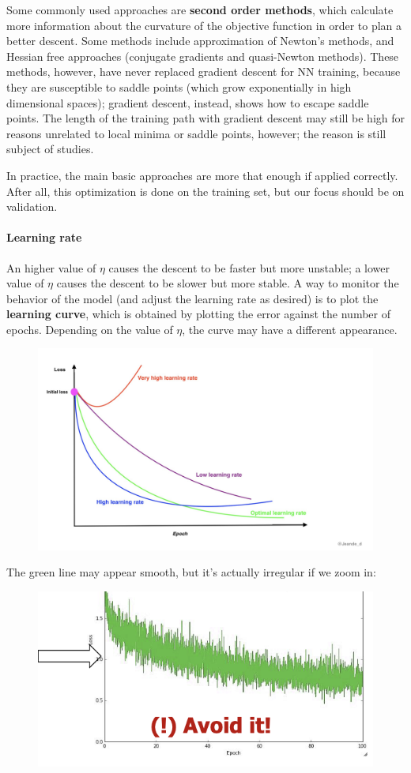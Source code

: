 Some commonly used approaches are \textbf{second order methods}, which calculate more information about the curvature of the objective function in order to plan a better descent. Some methods include approximation of Newton's methods, and Hessian free approaches (conjugate gradients and quasi-Newton methods). These methods, however, have never replaced gradient descent for NN training, because they are susceptible to saddle points (which grow exponentially in high dimensional spaces); gradient descent, instead, shows how to escape saddle points. The length of the training path with gradient descent may still be high for reasons unrelated to local minima or saddle points, however; the reason is still subject of studies. 

In practice, the main basic approaches are more that enough if applied correctly. After all, this optimization is done on the training set, but our focus should be on validation.

\paragraph{Learning rate}

An higher value of $\eta$ causes the descent to be faster but more unstable; a lower value of $\eta$ causes the descent to be slower but more stable. A way to monitor the behavior of the model (and adjust the learning rate as desired) is to plot the \textbf{learning curve}, which is obtained by plotting the error against the number of epochs. Depending on the value of $\eta$, the curve may have a different appearance.

\begin{figure}[h]
    \centering
    \includegraphics[width=0.5\linewidth]{img/Learning curve and eta.png}
\end{figure}
The green line may appear smooth, but it's actually irregular if we zoom in:
\begin{figure}[h]
    \centering
    \includegraphics[width=0.5\linewidth]{img/immagine.png}
\end{figure}

